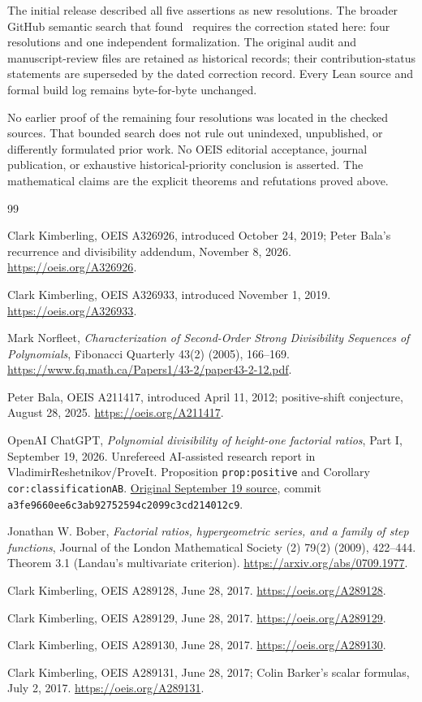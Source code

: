 \documentclass[11pt]{article}
\begin{document}
The initial release described all five assertions as new resolutions.
The broader GitHub semantic search that found~\cite{PriorFactorial}
requires the correction stated here: four resolutions and one
independent formalization. The original audit and manuscript-review
files are retained as historical records; their contribution-status
statements are superseded by the dated correction record. Every
Lean source and formal build log remains byte-for-byte unchanged.

No earlier proof of the remaining four resolutions was located in
the checked sources. That bounded search does not rule out
unindexed, unpublished, or differently formulated prior work.
No OEIS editorial acceptance, journal publication, or exhaustive
historical-priority conclusion is asserted. The mathematical
claims are the explicit theorems and refutations proved above.

\begin{thebibliography}{99}
\raggedright
{}
Clark Kimberling, OEIS A326926, introduced October 24, 2019;
Peter Bala's recurrence and divisibility addendum, November 8, 2026.
\url{https://oeis.org/A326926}.

Clark Kimberling, OEIS A326933, introduced November 1, 2019.
\url{https://oeis.org/A326933}.

Mark Norfleet, \emph{Characterization of Second-Order Strong
Divisibility Sequences of Polynomials}, Fibonacci Quarterly
43(2) (2005), 166--169.
\url{https://www.fq.math.ca/Papers1/43-2/paper43-2-12.pdf}.

Peter Bala, OEIS A211417, introduced April 11, 2012;
positive-shift conjecture, August 28, 2025.
\url{https://oeis.org/A211417}.

OpenAI ChatGPT, \emph{Polynomial divisibility of height-one
factorial ratios}, Part I, September 19, 2026. Unrefereed AI-assisted
research report in VladimirReshetnikov/ProveIt. Proposition
\texttt{prop:positive} and Corollary \texttt{cor:classificationAB}.
\href{https://github.com/VladimirReshetnikov/ProveIt/blob/a3fe9660ee6c3ab92752594c2099c3cd214012c9/docs/reports/congruences-and-valuations/factorial-ratio-polynomial-divisibility/article.tex}{Original September 19 source}, commit
\texttt{a3fe9660ee6c3ab92752594c2099c3cd214012c9}.

Jonathan W. Bober, \emph{Factorial ratios, hypergeometric series,
and a family of step functions}, Journal of the London Mathematical
Society (2) 79(2) (2009), 422--444. Theorem 3.1 (Landau's
multivariate criterion).
\url{https://arxiv.org/abs/0709.1977}.

Clark Kimberling, OEIS A289128, June 28, 2017.
\url{https://oeis.org/A289128}.

Clark Kimberling, OEIS A289129, June 28, 2017.
\url{https://oeis.org/A289129}.

Clark Kimberling, OEIS A289130, June 28, 2017.
\url{https://oeis.org/A289130}.

Clark Kimberling, OEIS A289131, June 28, 2017;
Colin Barker's scalar formulas, July 2, 2017.
\url{https://oeis.org/A289131}.
\end{thebibliography}
\end{document}
